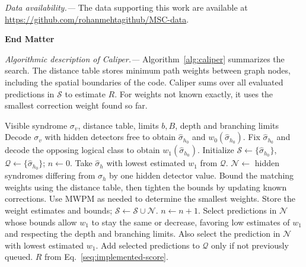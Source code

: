 \documentclass[
    reprint,
    amsmath,amssymb,
    nofootinbib,
    superscriptaddress,
    aps,
    noeprint,
    longbibliography,
    prl
]{revtex4-2}
\theoremstyle{plain}
\begin{document}
\textit{Data availability.---} The data supporting this work are available at
\url{https://github.com/rohanmehtagithub/MSC-data}.




\clearpage
\onecolumngrid
\begin{center}
    \Large\textbf{End Matter}
\end{center}
\normalsize
\twocolumngrid

\textit{Algorithmic description of Caliper.---} Algorithm~\ref{alg:caliper} summarizes the search.
The distance table stores minimum path weights between graph nodes, including the spatial boundaries of the code. Caliper sums over all evaluated predictions in $\mathcal S$ to estimate $R$. For weights not known exactly, it uses the smallest correction weight found so far.

\begin{algorithm}[H]
    \caption{Caliper}\label{alg:caliper}
    \footnotesize
    \begin{algorithmic}[1]
        \Require Visible syndrome $\sigma_v$, distance table, limits $b,B$, depth and branching limits
        \State Decode $\sigma_v$ with hidden detectors free to obtain $\hat\sigma_{h_0}$ and $w_0(\hat\sigma_{h_0})$.
        \State Fix $\hat\sigma_{h_0}$ and decode the opposing logical class to obtain $w_1(\hat\sigma_{h_0})$.
        \State Initialize $\mathcal S \gets \{\hat\sigma_{h_0}\}$, $\mathcal Q \gets \{\hat\sigma_{h_0}\}$; $n\gets 0$.
            \State Take $\hat\sigma_h$ with lowest estimated $w_1$ from $\mathcal Q$.
            \State $\mathcal N \gets$ hidden syndromes differing from $\hat\sigma_h$ by one hidden detector value.
            \State Bound the matching weights using the distance table, then tighten the bounds by updating known corrections.
            \State Use MWPM as needed to determine the smallest weights.
            \State Store the weight estimates and bounds; $\mathcal S\gets\mathcal S\cup\mathcal N$.
            \State $n\gets n+1$.
            \State Select predictions in $\mathcal N$ whose bounds allow $w_1$ to stay the same or decrease, favoring low estimates of $w_1$ and respecting the depth and branching limits.
                \State Also select the prediction in $\mathcal N$ with lowest estimated $w_1$.
            \EndIf
            \State Add selected predictions to $\mathcal Q$ only if not previously queued.
        \EndWhile
        \State \Return $R$ from Eq.~\eqref{seq:implemented-score}.
    \end{algorithmic}
\end{algorithm}
\end{document}
